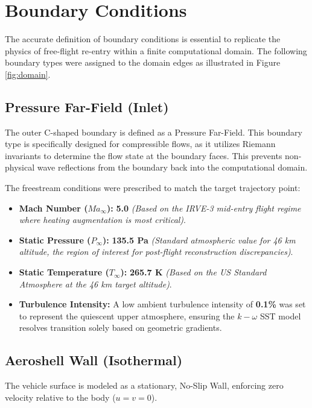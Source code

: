 \section{Boundary Conditions}
The accurate definition of boundary conditions is essential to replicate the physics of free-flight re-entry within a finite computational domain. The following boundary types were assigned to the domain edges as illustrated in Figure \ref{fig:domain}.

\subsection{Pressure Far-Field (Inlet)}
The outer C-shaped boundary is defined as a Pressure Far-Field. This boundary type is specifically designed for compressible flows, as it utilizes Riemann invariants to determine the flow state at the boundary faces. This prevents non-physical wave reflections from the boundary back into the computational domain.

The freestream conditions were prescribed to match the target trajectory point:
\begin{itemize}
    \item \textbf{Mach Number ($Ma_{\infty}$):} \textbf{5.0} 
    \textit{(Based on the IRVE-3 mid-entry flight regime where heating augmentation is most critical)}.
    
    \item \textbf{Static Pressure ($P_{\infty}$):} \textbf{135.5 Pa} 
    \textit{(Standard atmospheric value for 46 km altitude, the region of interest for post-flight reconstruction discrepancies)}.
    
    \item \textbf{Static Temperature ($T_{\infty}$):} \textbf{265.7 K} 
    \textit{(Based on the US Standard Atmosphere at the 46 km target altitude)}.
    
    \item \textbf{Turbulence Intensity:} A low ambient turbulence intensity of \textbf{0.1\%} was set to represent the quiescent upper atmosphere, ensuring the $k-\omega$ SST model resolves transition solely based on geometric gradients.
\end{itemize}

\subsection{Aeroshell Wall (Isothermal)}
The vehicle surface is modeled as a stationary, No-Slip Wall, enforcing zero velocity relative to the body ($u=v=0$). 

